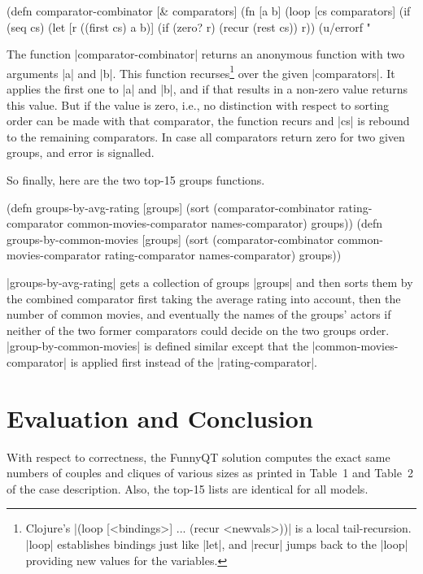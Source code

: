 \documentclass[submission]{eptcs}
\newcommand{\code}{\clojureinline}
\begin{document}
\begin{clojurecode}
(defn comparator-combinator [& comparators]
  (fn [a b]
    (loop [cs comparators]
      (if (seq cs)
        (let [r ((first cs) a b)]
          (if (zero? r)
            (recur (rest cs))
            r))
        (u/errorf "%
\end{clojurecode}

The function \code|comparator-combinator| returns an anonymous function with
two arguments \code|a| and \code|b|.  This function recurses\footnote{Clojure's
  \code|(loop [<bindings>] ... (recur <newvals>))| is a local tail-recursion.
  \code|loop| establishes bindings just like \code|let|, and \code|recur| jumps
  back to the \code|loop| providing new values for the variables.} over the
given \code|comparators|.  It applies the first one to \code|a| and \code|b|,
and if that results in a non-zero value returns this value.  But if the value
is zero, i.e., no distinction with respect to sorting order can be made with
that comparator, the function recurs and \code|cs| is rebound to the remaining
comparators.  In case all comparators return zero for two given groups, and
error is signalled.

So finally, here are the two top-15 groups functions.

\begin{clojurecode}
(defn groups-by-avg-rating [groups]
  (sort (comparator-combinator rating-comparator common-movies-comparator names-comparator) groups))
(defn groups-by-common-movies [groups]
  (sort (comparator-combinator common-movies-comparator rating-comparator names-comparator) groups))
\end{clojurecode}

\code|groups-by-avg-rating| gets a collection of groups \code|groups| and then
sorts them by the combined comparator first taking the average rating into
account, then the number of common movies, and eventually the names of the
groups' actors if neither of the two former comparators could decide on the two
groups order.  \code|group-by-common-movies| is defined similar except that the
\code|common-movies-comparator| is applied first instead of the
\code|rating-comparator|.


\section{Evaluation and Conclusion}
\label{sec:evaluation}

With respect to correctness, the FunnyQT solution computes the exact same
numbers of couples and cliques of various sizes as printed in Table~1 and
Table~2 of the case description.  Also, the top-15 lists are identical for all
models.
\end{document}
